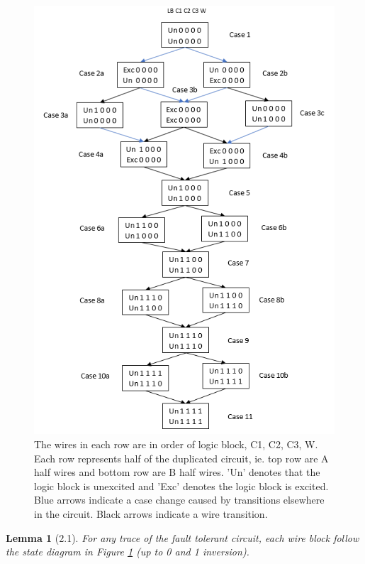 \documentclass[12pt]{report}
\newtheorem*{lemma}{Lemma}
\begin{document}
\begin{figure}
  \centering
    \includegraphics{flowl2c3}
  \caption{The wires in each row are in order of logic block, C1, C2, C3, W.  Each row represents half of the duplicated circuit, ie. top row are A half wires and bottom row are B half wires.  'Un' denotes that the logic block is unexcited and 'Exc' denotes the logic block is excited.  Blue arrows indicate a case change caused by transitions elsewhere in the circuit.  Black arrows indicate a wire transition.}
  \label{fig:l21}
\end{figure}
\begin{lemma}[2.1]
For any trace of the fault tolerant circuit, each wire block follow the state diagram in Figure \ref{fig:l21} (up to 0 and 1 inversion).
\end{lemma}
\end{document}
